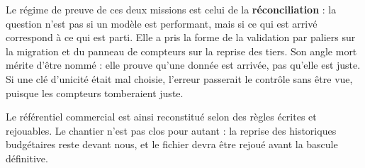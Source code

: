 Le régime de preuve de ces deux missions est celui de la \textbf{réconciliation} : la question n'est
pas si un modèle est performant, mais si ce qui est arrivé correspond à ce qui est parti. Elle
a pris la forme de la validation par paliers sur la migration et du panneau de compteurs sur
la reprise des tiers. Son angle mort mérite d'être nommé : elle prouve qu'une donnée est
arrivée, pas qu'elle est juste. Si une clé d'unicité était mal choisie, l'erreur passerait le
contrôle sans être vue, puisque les compteurs tomberaient juste.

Le référentiel commercial est ainsi reconstitué selon des règles écrites et rejouables. Le
chantier n'est pas clos pour autant : la reprise des historiques budgétaires reste devant
nous, et le fichier devra être rejoué avant la bascule définitive.
